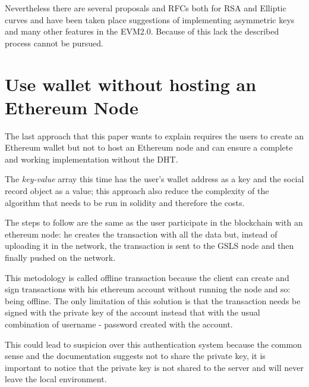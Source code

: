 Nevertheless there are several proposals and RFCs both for RSA and Elliptic curves \citep{ECImplementation} \citep{RSAImplementation} and have been taken place suggestions of implementing asymmetric keys and many other features in the EVM2.0.
Because of this lack the described process cannot be pursued.


\section{Use wallet without hosting an Ethereum Node}

The last approach that this paper wants to explain requires the users to create an Ethereum wallet but not to host an Ethereum node and can ensure a complete and working implementation without the DHT.

The \textit{key-value} array this time has the user's wallet address as a key and the social record object as a value; this approach also reduce the complexity of the algorithm that needs to be run in solidity and therefore the costs.

The steps to follow are the same as the user participate in the blockchain with an ethereum node: he creates the transaction with all the data but, instead of uploading it in the network, the transaction is sent to the GSLS node and then finally pushed on the network.

This metodology is called offline transaction because the client can create and sign transactions with his ethereum account without running the node and so: being offline. The only limitation of this solution is that the transaction needs be signed with the private key of the account instead that with the usual combination of username - password created with the account.

This could lead to suspicion over this authentication system because the common sense and the documentation suggests not to share the private key, it is important to notice that the private key is not shared to the server and will never leave the local environment.

